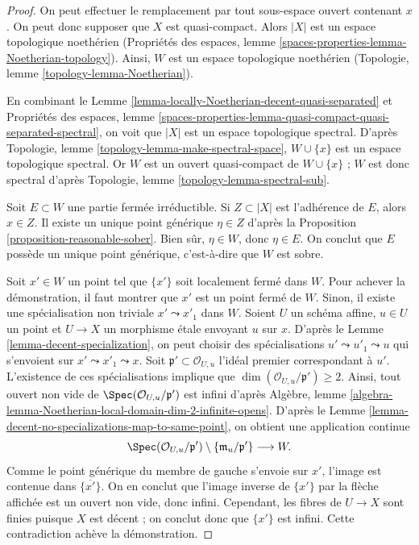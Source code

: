 \begin{proof}
On peut effectuer le remplacement par tout sous-espace ouvert contenant $x$.
On peut donc supposer que $X$ est quasi-compact.
Alors $|X|$ est un espace topologique noethérien
(Propriétés des espaces, lemme
\ref{spaces-properties-lemma-Noetherian-topology}).
Ainsi, $W$ est un espace topologique noethérien
(Topologie, lemme \ref{topology-lemma-Noetherian}).

\medskip\noindent
En combinant le Lemme \ref{lemma-locally-Noetherian-decent-quasi-separated}
et Propriétés des espaces, lemme
\ref{spaces-properties-lemma-quasi-compact-quasi-separated-spectral},
on voit que $|X|$ est un espace topologique spectral.
D'après Topologie, lemme \ref{topology-lemma-make-spectral-space},
$W \cup \{x\}$ est un espace topologique spectral.
Or $W$ est un ouvert quasi-compact de $W \cup \{x\}$ ; $W$ est donc spectral
d'après Topologie, lemme \ref{topology-lemma-spectral-sub}.

\medskip\noindent
Soit $E \subset W$ une partie fermée irréductible. Si $Z \subset |X|$ est
l'adhérence de $E$, alors $x \in Z$. Il existe un unique point générique
$\eta \in Z$ d'après la Proposition \ref{proposition-reasonable-sober}.
Bien sûr, $\eta \in W$, donc $\eta \in E$. On conclut que $E$ possède un
unique point générique, c'est-à-dire que $W$ est sobre.

\medskip\noindent
Soit $x' \in W$ un point tel que $\{x'\}$ soit localement fermé dans $W$.
Pour achever la démonstration, il faut montrer que $x'$ est un point fermé de
$W$. Sinon, il existe une spécialisation non triviale
$x' \leadsto x'_1$ dans $W$. Soient $U$ un schéma affine, $u \in U$ un point
et $U \to X$ un morphisme étale envoyant $u$ sur $x$. D'après le
Lemme \ref{lemma-decent-specialization}, on peut choisir des spécialisations
$u' \leadsto u'_1 \leadsto u$ qui s'envoient sur
$x' \leadsto x'_1 \leadsto x$.
Soit $\mathfrak p' \subset \mathcal{O}_{U, u}$ l'idéal premier correspondant
à $u'$. L'existence de ces spécialisations implique que
$\dim(\mathcal{O}_{U, u}/\mathfrak p') \geq 2$.
Ainsi, tout ouvert non vide de
$\Spec(\mathcal{O}_{U, u}/\mathfrak p')$ est infini d'après Algèbre, lemme
\ref{algebra-lemma-Noetherian-local-domain-dim-2-infinite-opens}.
D'après le Lemme \ref{lemma-decent-no-specializations-map-to-same-point},
on obtient une application continue
$$
\Spec(\mathcal{O}_{U, u}/\mathfrak p')
\setminus \{\mathfrak m_u/\mathfrak p'\}
\longrightarrow
W.
$$
Comme le point générique du membre de gauche s'envoie sur $x'$, l'image est
contenue dans $\overline{\{x'\}}$. On en conclut que l'image inverse de
$\{x'\}$ par la flèche affichée est un ouvert non vide, donc infini.
Cependant, les fibres de $U \to X$ sont finies puisque $X$ est décent ;
on conclut donc que $\{x'\}$ est infini. Cette contradiction achève la
démonstration.
\end{proof}






